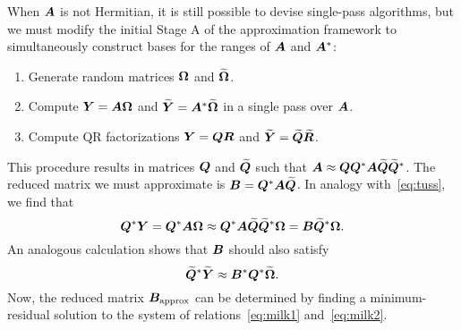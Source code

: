 \documentclass[12pt]{article}
\begin{document}
When $\bm{A}$ is not Hermitian, it is still possible to devise
single-pass algorithms, but we must modify the initial Stage A
of the approximation framework to simultaneously construct bases
for the ranges of $\bm{A}$ and $\bm{A}^{*}$:
\lsp
\begin{enumerate}
\item   Generate random matrices $\bm{\Omega}$ and $\widetilde{\bm{\Omega}}$.
\item   Compute $\bm{Y} = \bm{A\Omega}$ and
$\widetilde{\bm{Y}} = \bm{A}^{*}\widetilde{\bm{\Omega}}$ in a single pass over $\bm{A}$.
\item   Compute QR factorizations $\bm{Y} = \bm{QR}$ and
$\widetilde{\bm{Y}} = \widetilde{\bm{Q}}\widetilde{\bm{R}}$.
\end{enumerate}
\lsp
This procedure results in matrices $\bm{Q}$ and $\widetilde{\bm{Q}}$ such that
$\bm{A} \approx \bm{QQ}^{*}\bm{A}\widetilde{\bm{Q}}\widetilde{\bm{Q}}^{*}$.
The reduced matrix we must approximate is
$\bm{B} = \bm{Q}^{*}\bm{A}\widetilde{\bm{Q}}$.
In analogy with~\eqref{eq:tuss}, we find that
\begin{equation}
\label{eq:milk1}
\bm{Q}^{*}\bm{Y} =
\bm{Q}^{*}\bm{A\Omega} \approx
\bm{Q}^{*}\bm{A}\widetilde{\bm{Q}}\widetilde{\bm{Q}}^{*}\bm{\Omega} =
\bm{B}\widetilde{\bm{Q}}^{*}\bm{\Omega}.
\end{equation}
An analogous calculation shows that $\bm{B}$ should also satisfy
\begin{equation}
\label{eq:milk2}
\widetilde{\bm{Q}}^{*}\widetilde{\bm{Y}} \approx \bm{B}^{*}\bm{Q}^{*}\widetilde{\bm{\Omega}}.
\end{equation}
Now, the reduced matrix $\bm{B}_{\rm approx}$ can be determined by finding a
minimum-residual solution to the system of relations~\eqref{eq:milk1} and~\eqref{eq:milk2}.

\lsp

\end{document}
